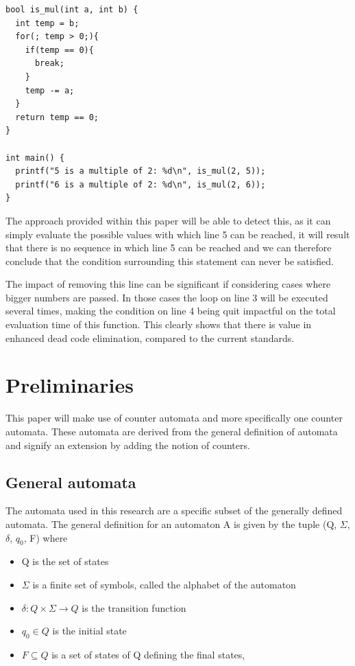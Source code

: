 \documentclass[12pt]{article}
\begin{document}
\begin{lstlisting}[style=CStyle]
bool is_mul(int a, int b) {
  int temp = b;
  for(; temp > 0;){
    if(temp == 0){
      break;
    }
    temp -= a;
  }
  return temp == 0;
}

int main() {
  printf("5 is a multiple of 2: %d\n", is_mul(2, 5));
  printf("6 is a multiple of 2: %d\n", is_mul(2, 6));
}
\end{lstlisting}

The approach provided within this paper will be able to detect this, as it can simply evaluate the possible values with which line 5 can be reached, it will result that there is no sequence in which line 5 can be reached and we can therefore conclude that the condition surrounding this statement can never be satisfied.

The impact of removing this line can be significant if considering cases where bigger numbers are passed. In those cases the loop on line 3 will be executed several times, making the condition on line 4 being quit impactful on the total evaluation time of this function. This clearly shows that there is value in enhanced dead code elimination, compared to the current standards. 

\section{Preliminaries}
This paper will make use of counter automata and more specifically one counter automata. These automata are derived from the general definition of automata and signify an extension by adding the notion of counters.

\subsection{General automata}
The automata used in this research are a specific subset of the generally defined automata. The general definition for an automaton A is given by the tuple (Q, $\Sigma$, $\delta$, $q_0$, F) where
\begin{itemize}
	\item Q is the set of states
	\item $\Sigma$ is a finite set of symbols, called the alphabet of the automaton
	\item $\delta: Q \times \Sigma \rightarrow Q$ is the transition function
	\item $q_0 \in Q$ is the initial state
	\item $F \subseteq Q$ is a set of states of Q defining the final states, 
\end{itemize}
\end{document}
